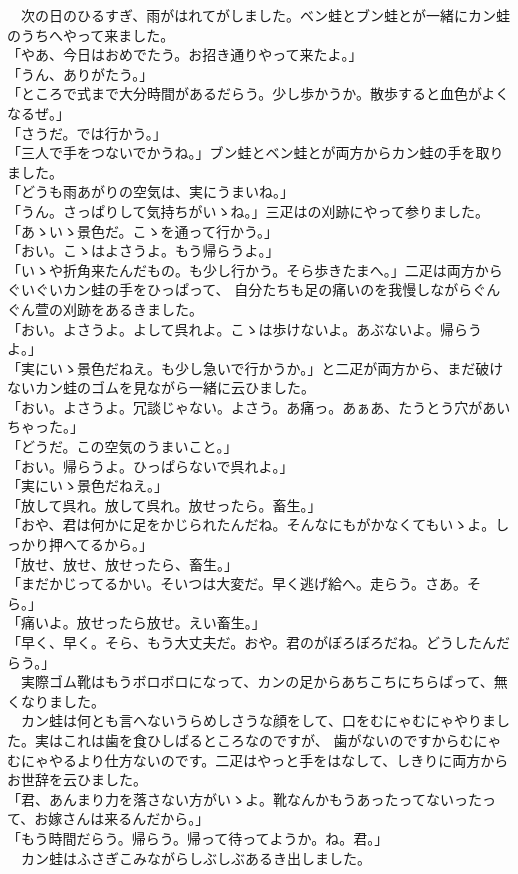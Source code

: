 \documentclass[
a4paper,
book]
{tarticle}
\begin{document}
　次の日のひるすぎ、雨がはれてがしました。ベン蛙とブン蛙とが一緒にカン蛙のうちへやって来ました。\\
「やあ、今日はおめでたう。お招き通りやって来たよ。」\\
「うん、ありがたう。」\\
「ところで式まで大分時間があるだらう。少し歩かうか。散歩すると血色がよくなるぜ。」\\
「さうだ。では行かう。」\\
「三人で手をつないでかうね。」ブン蛙とベン蛙とが両方からカン蛙の手を取りました。\\
「どうも雨あがりの空気は、実にうまいね。」\\
「うん。さっぱりして気持ちがいゝね。」三疋はの刈跡にやって参りました。\\
「あゝいゝ景色だ。こゝを通って行かう。」\\
「おい。こゝはよさうよ。もう帰らうよ。」\\
「いゝや折角来たんだもの。も少し行かう。そら歩きたまへ。」二疋は両方からぐいぐいカン蛙の手をひっぱって、
自分たちも足の痛いのを我慢しながらぐんぐん萱の刈跡をあるきました。\\
「おい。よさうよ。よして呉れよ。こゝは歩けないよ。あぶないよ。帰らうよ。」\\
「実にいゝ景色だねえ。も少し急いで行かうか。」と二疋が両方から、まだ破けないカン蛙のゴムを見ながら一緒に云ひました。\\
「おい。よさうよ。冗談じゃない。よさう。あ痛っ。あぁあ、たうとう穴があいちゃった。」\\
「どうだ。この空気のうまいこと。」\\
「おい。帰らうよ。ひっぱらないで呉れよ。」\\
「実にいゝ景色だねえ。」\\
「放して呉れ。放して呉れ。放せったら。畜生。」\\
「おや、君は何かに足をかじられたんだね。そんなにもがかなくてもいゝよ。しっかり押へてるから。」\\
「放せ、放せ、放せったら、畜生。」\\
「まだかじってるかい。そいつは大変だ。早く逃げ給へ。走らう。さあ。そら。」\\
「痛いよ。放せったら放せ。えい畜生。」\\
「早く、早く。そら、もう大丈夫だ。おや。君のがぼろぼろだね。どうしたんだらう。」\\
　実際ゴム靴はもうボロボロになって、カンの足からあちこちにちらばって、無くなりました。\\
　カン蛙は何とも言へないうらめしさうな顔をして、口をむにゃむにゃやりました。実はこれは歯を食ひしばるところなのですが、
歯がないのですからむにゃむにゃやるより仕方ないのです。二疋はやっと手をはなして、しきりに両方からお世辞を云ひました。\\
「君、あんまり力を落さない方がいゝよ。靴なんかもうあったってないったって、お嫁さんは来るんだから。」\\
「もう時間だらう。帰らう。帰って待ってようか。ね。君。」\\
　カン蛙はふさぎこみながらしぶしぶあるき出しました。\\
\end{document}
